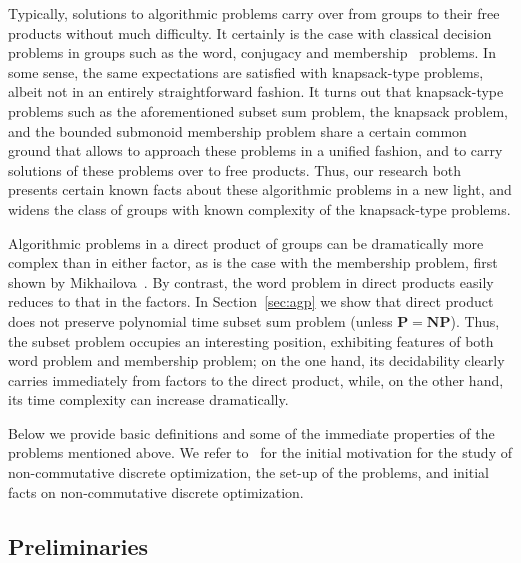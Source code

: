 \documentclass[10pt]{amsart}
\theoremstyle{definition}
\def\P{{\mathbf{P}}}
\def\NP{{\mathbf{NP}}}
\begin{document}
Typically, solutions to algorithmic problems carry over from groups to their free products without much difficulty. It certainly is the case with classical decision problems in groups such as the word, conjugacy and membership~\cite{Mikhailova_68} problems. In some sense, the same expectations are satisfied with knapsack-type problems, albeit not in an entirely straightforward fashion. It turns out that knapsack-type problems such as the aforementioned subset sum problem, the knapsack problem, and the bounded submonoid membership problem share a certain common ground that allows to approach these problems in a unified fashion, and to carry solutions of these problems over to free products. Thus, our research both presents certain known facts about these algorithmic problems in a new light, and widens the class of groups with known complexity of the knapsack-type problems.

Algorithmic problems in a direct product of groups can be dramatically more complex than in either factor, as is the case with the membership problem, first shown by Mikhailova~\cite{Mikhailova}. By contrast, the word problem in direct products easily reduces to that in the factors.
In Section~\ref{sec:agp} we show that direct product does not preserve polynomial time subset sum problem (unless $\P=\NP$). Thus, the subset problem occupies an interesting position, exhibiting features of both word problem and membership problem; on the one hand, its decidability clearly carries immediately from factors to the direct product, while, on the other hand, its time complexity can increase dramatically. %


Below we provide basic definitions and some of the immediate properties of the problems mentioned above.
We refer to~\cite{Miasnikov-Nikolaev-Ushakov:2014a,Miasnikov-Nikolaev-Ushakov:2014b} for the initial motivation for the study of non-commutative discrete optimization, the set-up of the problems, and initial facts on non-commutative discrete optimization.

\subsection{Preliminaries}\label{sec:prelim}\label{sec:problems}
\end{document}
